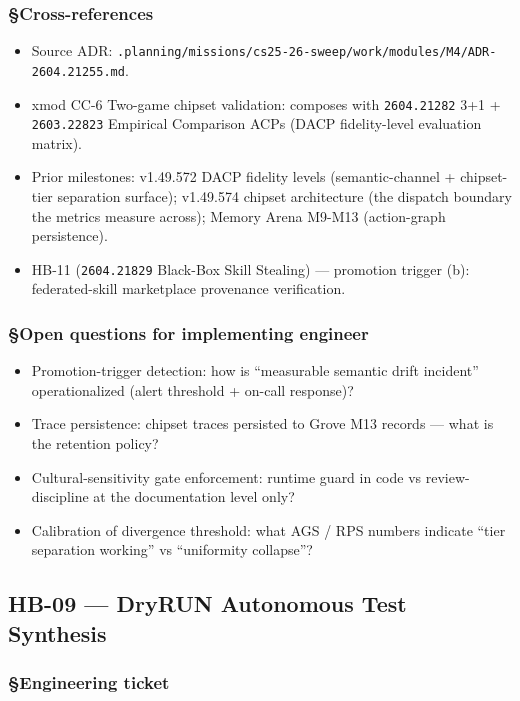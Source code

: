 \documentclass[11pt,letterpaper]{article}
\newcommand{\arxivid}[1]{\texttt{\textcolor{accent}{#1}}}
\providecommand{\tightlist}{\setlength{\itemsep}{0pt}\setlength{\parskip}{0pt}}
\begin{document}
\subsubsection{§Cross-references}

\begin{itemize}
\tightlist
\item
  Source ADR:
  \texttt{.planning/missions/cs25-26-sweep/work/modules/M4/ADR-\arxivid{2604.21255}.md}.
\item
  xmod CC-6 Two-game chipset validation: composes with
  \arxivid{2604.21282} 3+1 + \arxivid{2603.22823} Empirical Comparison
  ACPs (DACP fidelity-level evaluation matrix).
\item
  Prior milestones: v1.49.572 DACP fidelity levels (semantic-channel +
  chipset-tier separation surface); v1.49.574 chipset architecture (the
  dispatch boundary the metrics measure across); Memory Arena M9-M13
  (action-graph persistence).
\item
  HB-11 (\arxivid{2604.21829} Black-Box Skill Stealing) --- promotion
  trigger (b): federated-skill marketplace provenance verification.
\end{itemize}

\subsubsection{§Open questions for implementing
engineer}

\begin{itemize}
\tightlist
\item
  Promotion-trigger detection: how is ``measurable semantic drift
  incident'' operationalized (alert threshold + on-call response)?
\item
  Trace persistence: chipset traces persisted to Grove M13 records ---
  what is the retention policy?
\item
  Cultural-sensitivity gate enforcement: runtime guard in code vs
  review-discipline at the documentation level only?
\item
  Calibration of divergence threshold: what AGS / RPS numbers indicate
  ``tier separation working'' vs ``uniformity collapse''?
\end{itemize}


\subsection{HB-09 — DryRUN Autonomous Test Synthesis}
\subsubsection{§Engineering ticket}
\end{document}
